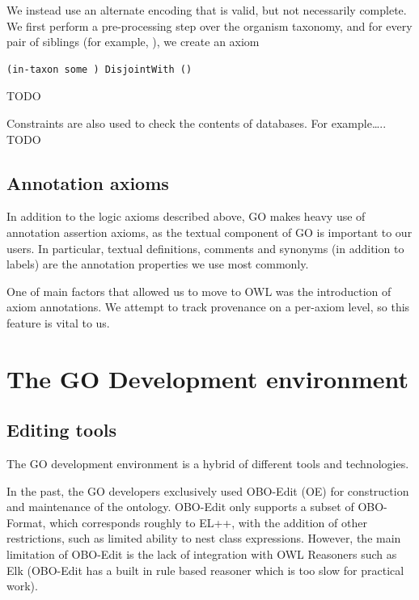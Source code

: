 \documentclass{llncs}
\begin{document}
We instead use an alternate encoding that is valid, but not
necessarily complete. We first perform a pre-processing step over the
organism taxonomy, and for every pair of siblings (for example, ), we
create an axiom

\begin{verbatim}
(in-taxon some ) DisjointWith ()
\end{verbatim}

TODO

Constraints are also used to check the contents of databases. For
example….. TODO


\subsection{Annotation axioms}

In addition to the logic axioms described above, GO makes heavy use of
annotation assertion axioms, as the textual component of GO is
important to our users. In particular, textual definitions, comments
and synonyms (in addition to labels) are the annotation properties we
use most commonly.

One of main factors that allowed us to move to OWL was the
introduction of axiom annotations. We attempt to track provenance on a
per-axiom level, so this feature is vital to us.

\section{The GO Development environment}

\subsection{Editing tools}

The GO development environment is a hybrid of different tools and
technologies.

In the past, the GO developers exclusively used
OBO-Edit (OE)\cite{Day-Richter2007} for construction and maintenance of the
ontology. OBO-Edit only supports a subset of OBO-Format, which
corresponds roughly to EL++, with the addition of other restrictions,
such as limited ability to nest class expressions. However, the main
limitation of OBO-Edit is the lack of integration with OWL Reasoners
such as Elk (OBO-Edit has a built in rule based reasoner which is too
slow for practical work).
\end{document}
